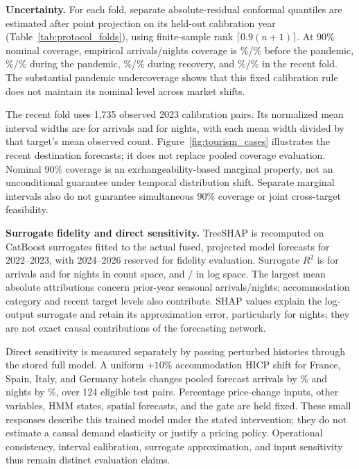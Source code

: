 \documentclass[sigconf]{acmart}
\begin{document}
\textbf{Uncertainty.} For each fold, separate absolute-residual conformal quantiles are estimated after point projection on its held-out calibration year (Table~\ref{tab:protocol_folds}), using finite-sample rank $\lceil0.9(n+1)\rceil$. At 90\% nominal coverage, empirical arrivals/nights coverage is \ResultCoverageTranquilArr\%/\ResultCoverageTranquilNig\% before the pandemic, \ResultCoverageShockArr\%/\ResultCoverageShockNig\% during the pandemic, \ResultCoverageRecoveryArr\%/\ResultCoverageRecoveryNig\% during recovery, and \ResultCoverageRecentArr\%/\ResultCoverageRecentNig\% in the recent fold. The substantial pandemic undercoverage shows that this fixed calibration rule does not maintain its nominal level across market shifts.

The recent fold uses 1,735 observed 2023 calibration pairs. Its normalized mean interval widths are \ResultWidthArr{} for arrivals and \ResultWidthNig{} for nights, with each mean width divided by that target's mean observed count. Figure~\ref{fig:tourism_cases} illustrates the recent destination forecasts; it does not replace pooled coverage evaluation. Nominal 90\% coverage is an exchangeability-based marginal property, not an unconditional guarantee under temporal distribution shift. Separate marginal intervals also do not guarantee simultaneous 90\% coverage or joint cross-target feasibility.

\textbf{Surrogate fidelity and direct sensitivity.} TreeSHAP \cite{lundberg2020treeshap} is recomputed on CatBoost surrogates fitted to the actual fused, projected model forecasts for 2022--2023, with 2024--2026 reserved for fidelity evaluation. Surrogate $R^2$ is \ResultFidelityCountsArr{} for arrivals and \ResultFidelityCountsNig{} for nights in count space, and \ResultFidelityLogArr/\ResultFidelityLogNig{} in log space. The largest mean absolute attributions concern prior-year seasonal arrivals/nights; accommodation category and recent target levels also contribute. SHAP values explain the log-output surrogate and retain its approximation error, particularly for nights; they are not exact causal contributions of the forecasting network.

Direct sensitivity is measured separately by passing perturbed histories through the stored full model. A uniform $+10\%$ accommodation HICP shift for France, Spain, Italy, and Germany hotels changes pooled forecast arrivals by \ResultPriceArr\% and nights by \ResultPriceNig\%, over 124 eligible test pairs. Percentage price-change inputs, other variables, HMM states, spatial forecasts, and the gate are held fixed. These small responses describe this trained model under the stated intervention; they do not estimate a causal demand elasticity or justify a pricing policy. Operational consistency, interval calibration, surrogate approximation, and input sensitivity thus remain distinct evaluation claims.
\end{document}
